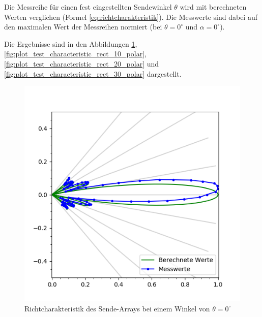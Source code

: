 Die Messreihe für einen fest eingestellten Sendewinkel $\theta$ wird mit berechneten Werten verglichen (Formel \ref{eq:richtcharakteristik}).
Die Messwerte sind dabei auf den maximalen Wert der Messreihen normiert (bei $\theta = 0^{\circ}$ und $\alpha = 0^{\circ}$).

Die Ergebnisse sind in den Abbildungen \ref{fig:plot_test_characteristic_rect_0_polar}, \ref{fig:plot_test_characteristic_rect_10_polar}, \ref{fig:plot_test_characteristic_rect_20_polar} und \ref{fig:plot_test_characteristic_rect_30_polar} dargestellt.

\begin{figure}[htb]
\begin{minipage}{0.5\textwidth}
\includegraphics[width=\textwidth]{graphics/plot_test_characteristic_rect_0_polar.png}
\caption{Richtcharakteristik des Sende-Arrays bei einem Winkel von $\theta = 0^{\circ}$} %
\label{fig:plot_test_characteristic_rect_0_polar}
%
\end{minipage}
\begin{minipage}{0.5\textwidth}

\end{minipage}
\end{figure}
